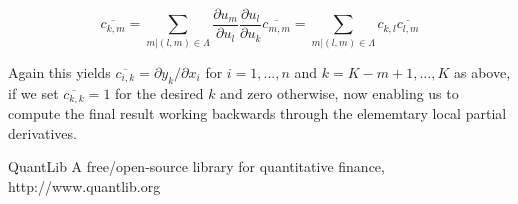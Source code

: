 \documentclass{amsart}
\theoremstyle{plain}
\numberwithin{equation}{section}
\begin{document}
\begin{equation}
\overline{c_{k,m}} = \sum_{m|(l,m)\in\Lambda} \frac{\partial u_m}{\partial u_l} \frac{\partial u_l}{\partial u_k} \overline{c_{m,m}} = \sum_{m|(l,m)\in{\Lambda}} c_{k,l} \overline{c_{l,m}}
\end{equation}

Again this yields $\overline{c_{i,k}} = \partial{y_k}/\partial{x_i}$ for $i=1,\dots,n$ and $k=K-m+1,\dots,K$ as above, if we set $\overline{c_{k,k}} = 1$ for the desired $k$ and zero otherwise, now enabling us to compute the final result working backwards through the elememtary local partial derivatives.




\begin{thebibliography}{2}

QuantLib A free/open-source library for quantitative finance, http://www.quantlib.org

\end{thebibliography}
\end{document}
